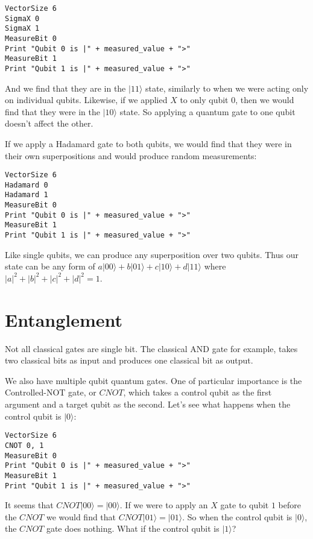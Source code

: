 \documentclass[twocolumn]{article}
\begin{document}
\begin{lstlisting}
VectorSize 6
SigmaX 0
SigmaX 1
MeasureBit 0
Print "Qubit 0 is |" + measured_value + ">"
MeasureBit 1
Print "Qubit 1 is |" + measured_value + ">"
\end{lstlisting}

And we find that they are in the $|11\rangle$ state, similarly to when we were acting only on individual qubits. Likewise, if we applied $X$ to only qubit $0$, then we would find that they were in the $|10\rangle$ state. So applying a quantum gate to one qubit doesn't affect the other.

If we apply a Hadamard gate to both qubits, we would find that they were in their own superpositions and would produce random measurements:

\begin{lstlisting}
VectorSize 6
Hadamard 0
Hadamard 1
MeasureBit 0
Print "Qubit 0 is |" + measured_value + ">"
MeasureBit 1
Print "Qubit 1 is |" + measured_value + ">"
\end{lstlisting}

Like single qubits, we can produce any superposition over two qubits. Thus our state can be any form of $a|00\rangle + b|01\rangle + c|10\rangle + d|11\rangle$ where $|a|^2 + |b|^2 + |c|^2 + |d|^2 = 1$.

\section{Entanglement}

Not all classical gates are single bit. The classical AND gate for example, takes two classical bits as input and produces one classical bit as output.

We also have multiple qubit quantum gates. One of particular importance is the Controlled-NOT gate, or $CNOT$, which takes a control qubit as the first argument and a target qubit as the second. Let's see what happens when the control qubit is $|0\rangle$:

\begin{lstlisting}
VectorSize 6
CNOT 0, 1
MeasureBit 0
Print "Qubit 0 is |" + measured_value + ">"
MeasureBit 1
Print "Qubit 1 is |" + measured_value + ">"
\end{lstlisting}

It seems that $CNOT|00\rangle = |00\rangle$. If we were to apply an $X$ gate to qubit $1$ before the $CNOT$ we would find that $CNOT|01\rangle = |01\rangle$. So when the control qubit is $|0\rangle$, the $CNOT$ gate does nothing. What if the control qubit is $|1\rangle$?
\end{document}
